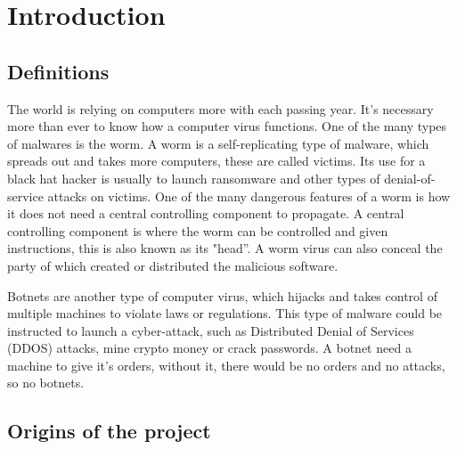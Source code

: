 \documentclass[../main.tex]{subfiles}
\begin{document}
    \newpage

	\chapter{Introduction}

    \section{Definitions}

    The world is relying on computers more with each passing year.
    It's necessary more than ever to know how a computer virus functions. 
    One of the many types of malwares is the worm.
    A worm is a self-replicating type of malware, which spreads out and takes more computers, these are called victims. 
    Its use for a black hat hacker is usually to launch ransomware and other types of denial-of-service attacks on victims. 
    One of the many dangerous features of a worm is how it does not need a central controlling component to propagate. 
    A central controlling component is where the worm can be controlled and given instructions, this is also known as its "head”. 
    A worm virus can also conceal the party of which created or distributed the malicious software. 

    Botnets are another type of computer virus, which hijacks and takes control of multiple machines to violate laws or regulations. 
    This type of malware could be instructed to launch a cyber-attack, such as Distributed Denial of Services (DDOS) attacks, mine crypto money or crack passwords. 
    A botnet need a machine to give it's orders, without it, there would be no orders and no attacks, so no botnets.

	\vspace{10pt}
    
    \section{Origins of the project}
\end{document}
